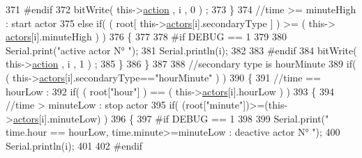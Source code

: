 \begin{DoxyCode}
371 \textcolor{preprocessor}{                            #endif  }
372                                 bitWrite( this->\hyperlink{class_jetpack_aca3142925a7b0834b34ae91d26af7765}{action} , i , 0 ) ;    
373                             \}
374                             \textcolor{comment}{//time >= minuteHigh : start actor}
375                             \textcolor{keywordflow}{else} \textcolor{keywordflow}{if}( ( root[ this->\hyperlink{class_jetpack_a7e16d2f97837f9712a2e6de1c50d99db}{actors}[i].secondaryType ] ) >= ( this->
      \hyperlink{class_jetpack_a7e16d2f97837f9712a2e6de1c50d99db}{actors}[i].minuteHigh ) )
376                             \{
377                         
378 \textcolor{preprocessor}{                            #if DEBUG == 1 }
379                         
380                                 Serial.print(\textcolor{stringliteral}{"active actor N° "});
381                                 Serial.println(i);
382                         
383 \textcolor{preprocessor}{                            #endif}
384                                 bitWrite( this->\hyperlink{class_jetpack_aca3142925a7b0834b34ae91d26af7765}{action} , i , 1 ) ;                    
385                             \}
386                         \}
387 
388                         \textcolor{comment}{//secondary type is hourMinute  }
389                         \textcolor{keywordflow}{if}( ( this->\hyperlink{class_jetpack_a7e16d2f97837f9712a2e6de1c50d99db}{actors}[i].secondaryType==\textcolor{stringliteral}{"hourMinute"} ) )
390                         \{
391                             \textcolor{comment}{//time == hourLow :}
392                             \textcolor{keywordflow}{if}( ( root[\textcolor{stringliteral}{"hour"}] ) == ( this->\hyperlink{class_jetpack_a7e16d2f97837f9712a2e6de1c50d99db}{actors}[i].hourLow ) )     
393                             \{
394                                 \textcolor{comment}{//time > minuteLow : stop actor}
395                                 \textcolor{keywordflow}{if}( (root[\textcolor{stringliteral}{"minute"}])>=(this->\hyperlink{class_jetpack_a7e16d2f97837f9712a2e6de1c50d99db}{actors}[i].minuteLow) )                       
396                                 \{
397 \textcolor{preprocessor}{                                #if DEBUG == 1 }
398                         
399                                     Serial.print(\textcolor{stringliteral}{" time.hour == hourLow, time.minute>=minuteLow : deactive
       actor N° "});
400                                     Serial.println(i);
401                     
402 \textcolor{preprocessor}{                                #endif  }

\end{DoxyCode}
